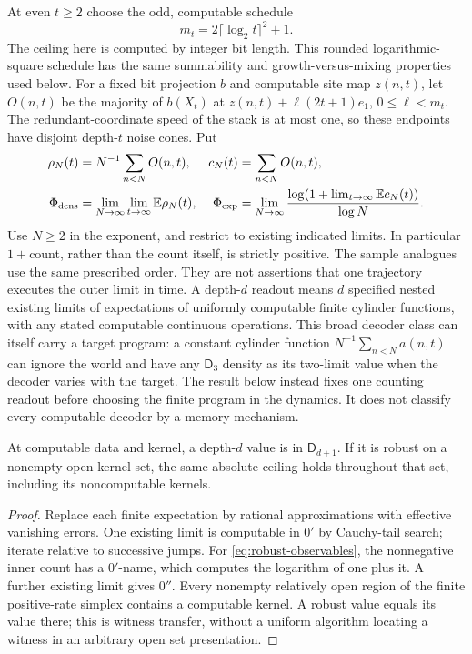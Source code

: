 At even $t\geq2$ choose the odd, computable schedule
\[
 m_t=2\lceil\log_2t\rceil^2+1.
\]
The ceiling here is computed by integer bit length. This rounded
logarithmic-square schedule has the same summability and
growth-versus-mixing properties used below.
For a fixed bit projection $b$ and computable site map $z(n,t)$,
let $O(n,t)$ be the majority of $b(X_t)$ at
$z(n,t)+\ell(2t+1)e_1$, $0\leq\ell<m_t$.
The redundant-coordinate speed of the stack is at most one, so these
endpoints have disjoint depth-$t$ noise cones. Put
\begin{align}
 \rho_N(t)&=N^{-1}\sum_{n<N}O(n,t),&
 c_N(t)&=\sum_{n<N}O(n,t),\notag\\
 \Phi_{\rm dens}&=\lim_{N\to\infty}\lim_{t\to\infty}
                 \mathbb E\rho_N(t),&
 \Phi_{\rm exp}&=\lim_{N\to\infty}
  \frac{\log(1+\lim_{t\to\infty}\mathbb E c_N(t))}{\log N}.
 \label{eq:robust-observables}
\end{align}
Use $N\geq2$ in the exponent, and restrict to existing indicated
limits. In particular $1+$count, rather than the count itself, is
strictly positive. The sample analogues use the same prescribed
order. They are not assertions that one trajectory executes the
outer limit in time. A depth-$d$ readout means $d$ specified nested
existing limits of expectations of uniformly computable finite
cylinder functions, with any stated computable continuous operations.
This broad decoder class can itself carry a target program: a constant
cylinder function $N^{-1}\sum_{n<N}a(n,t)$ can ignore the world and
have any $\mathsf D_3$ density as its two-limit value when the decoder
varies with the target. The result below instead fixes one counting
readout before choosing the finite program in the dynamics. It does
not classify every computable decoder by a memory mechanism.

\begin{proposition}\label{prop:robust-depth}
At computable data and kernel, a depth-$d$ value is in
$\mathsf D_{d+1}$. If it is robust on a nonempty open kernel set,
the same absolute ceiling holds throughout that set, including its
noncomputable kernels.
\end{proposition}
\begin{proof}
Replace each finite expectation by rational approximations with
effective vanishing errors. One existing limit is computable in
$0'$ by Cauchy-tail search; iterate relative to successive jumps.
For \eqref{eq:robust-observables}, the nonnegative inner count has
a $0'$-name, which computes the logarithm of one plus it. A further
existing limit gives $0''$. Every nonempty relatively open region
of the finite positive-rate simplex contains a computable kernel.
A robust value equals its value there; this is witness transfer,
without a uniform algorithm locating a witness in an arbitrary open
set presentation.
\end{proof}

